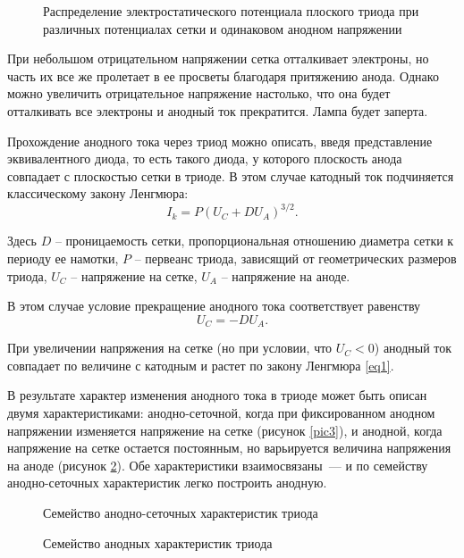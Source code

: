 \begin{figure}[ht]
    \center
    \caption{Распределение электростатического потенциала плоского триода при
    различных потенциалах сетки и одинаковом анодном напряжении}
    \label{pic2}
\end{figure}

При небольшом отрицательном напряжении сетка отталкивает электроны, но часть их
все же пролетает в ее просветы благодаря притяжению анода. Однако можно
увеличить отрицательное напряжение настолько, что она будет отталкивать все
электроны и анодный ток прекратится. Лампа будет заперта.

Прохождение анодного тока через триод можно описать, введя представление
эквивалентного диода, то есть такого диода, у которого плоскость анода
совпадает с плоскостью сетки в триоде. В этом случае катодный ток подчиняется
классическому закону Ленгмюра:
\begin{equation}
    I_k = P(U_C + DU_A)^{3/2}.
    \label{eq1}
\end{equation}

Здесь \( D \) -- проницаемость сетки, пропорциональная отношению диаметра сетки
к периоду ее намотки, \( P \) -- первеанс триода, зависящий от геометрических
размеров триода, \( U_C \) -- напряжение на сетке, \( U_A \) -- напряжение на
аноде.

В этом случае условие прекращение анодного тока соответствует равенству
\begin{equation}
    U_C = -DU_A.
    \label{eq2}
\end{equation}

При увеличении напряжения на сетке (но при условии, что \( U_C < 0 \)) анодный
ток совпадает по величине с катодным и растет по закону Ленгмюра \eqref{eq1}.

В результате характер изменения анодного тока в триоде может быть описан двумя
характеристиками: анодно-сеточной, когда при фиксированном анодном напряжении
изменяется напряжение на сетке (рисунок \ref{pic3}), и анодной, когда
напряжение на сетке остается постоянным, но варьируется величина напряжения на
аноде (рисунок \ref{pic4}). Обе характеристики взаимосвязаны~--- и по семейству
анодно-сеточных характеристик легко построить анодную.

\begin{figure}[ht]
    \center
    \parbox{.45\textwidth}{\caption{Семейство анодно-сеточных характеристик
    триода}\label{pic3}} \hspace{3em}
    \parbox{.45\textwidth}{\caption{Семейство анодных характеристик триода}
    \label{pic4}}
\end{figure}


